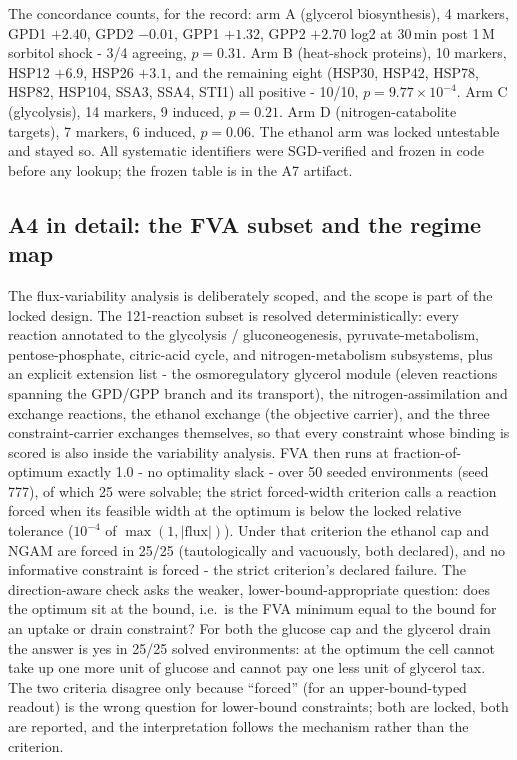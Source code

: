 \documentclass[12pt]{article}
\begin{document}
The concordance counts, for the record: arm A (glycerol
biosynthesis), 4 markers, GPD1 $+2.40$, GPD2 $-0.01$, GPP1 $+1.32$,
GPP2 $+2.70$ log2 at 30\,min post 1\,M sorbitol shock - 3/4
agreeing, $p=0.31$. Arm B (heat-shock proteins), 10 markers, HSP12
$+6.9$, HSP26 $+3.1$, and the remaining eight (HSP30, HSP42, HSP78,
HSP82, HSP104, SSA3, SSA4, STI1) all positive - 10/10,
$p=9.77\times10^{-4}$. Arm C (glycolysis), 14 markers, 9 induced,
$p=0.21$. Arm D (nitrogen-catabolite targets), 7 markers, 6 induced,
$p=0.06$. The ethanol arm was locked untestable and stayed so. All
systematic identifiers were SGD-verified and frozen in code before
any lookup; the frozen table is in the A7 artifact.


\subsection{A4 in detail: the FVA subset and the regime map}
\label{sec:a4detail}

The flux-variability analysis is deliberately scoped, and the scope
is part of the locked design. The 121-reaction subset is resolved
deterministically: every reaction annotated to the glycolysis /
gluconeogenesis, pyruvate-metabolism, pentose-phosphate, citric-acid
cycle, and nitrogen-metabolism subsystems, plus an explicit
extension list - the osmoregulatory glycerol module (eleven reactions
spanning the GPD/GPP branch and its transport), the
nitrogen-assimilation and exchange reactions, the ethanol exchange
(the objective carrier), and the three constraint-carrier exchanges
themselves, so that every constraint whose binding is scored is also
inside the variability analysis. FVA then runs at fraction-of-optimum
exactly 1.0 - no optimality slack - over 50 seeded environments
(seed 777), of which 25 were solvable; the strict forced-width
criterion calls a reaction forced when its feasible width at the
optimum is below the locked relative tolerance ($10^{-4}$ of
$\max(1,|\mathrm{flux}|)$). Under that criterion the ethanol cap and
NGAM are forced in 25/25 (tautologically and vacuously, both
declared), and no informative constraint is forced - the strict
criterion's declared failure. The direction-aware check asks the
weaker, lower-bound-appropriate question: does the optimum sit at the
bound, i.e.\ is the FVA minimum equal to the bound for an uptake or
drain constraint? For both the glucose cap and the glycerol drain the
answer is yes in 25/25 solved environments: at the optimum the cell
cannot take up one more unit of glucose and cannot pay one less unit
of glycerol tax. The two criteria disagree only because ``forced''
(for an upper-bound-typed readout) is the wrong question for
lower-bound constraints; both are locked, both are reported, and the
interpretation follows the mechanism rather than the criterion.
\end{document}
